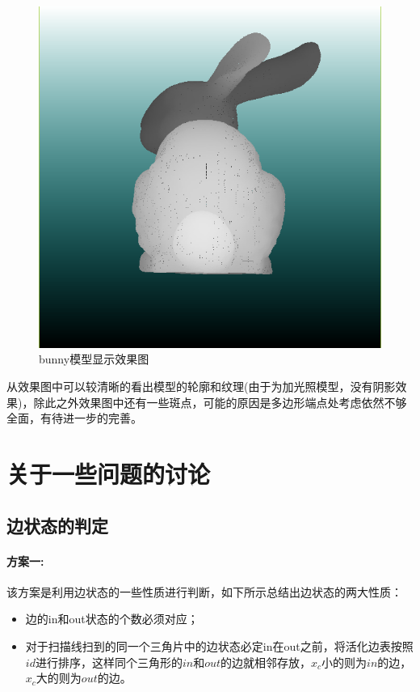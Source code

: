 \documentclass[10pt]{article}
\begin{document}
\begin{figure}[H]
\begin{center}
\includegraphics[scale=0.5]{bunny.png}
\caption{bunny模型显示效果图}
\end{center}
\end{figure}
从效果图中可以较清晰的看出模型的轮廓和纹理(由于为加光照模型，没有阴影效果)，除此之外效果图中还有一些斑点，可能的原因是多边形端点处考虑依然不够全面，有待进一步的完善。

\section{关于一些问题的讨论}
\subsection{边状态的判定}
\paragraph{方案一:}
该方案是利用边状态的一些性质进行判断，如下所示总结出边状态的两大性质：
\begin{itemize}
\item{边的in和out状态的个数必须对应；}
\item{对于扫描线扫到的同一个三角片中的边状态必定in在out之前，将活化边表按照$id$进行排序，这样同个三角形的$in$和$out$的边就相邻存放，$x_c$小的则为$in$的边，$x_c$大的则为$out$的边。}
\end{itemize}
\end{document}
